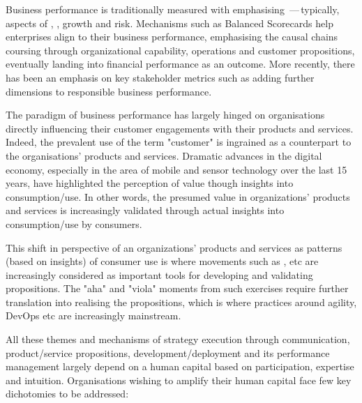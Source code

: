 Business performance is traditionally measured with  emphasising
\,---\,typically, aspects of , ,
growth and risk.
Mechanisms such as Balanced Scorecards help enterprises align 
to their business performance, emphasising the causal chains coursing through organizational capability, operations and
customer propositions, eventually landing into financial performance as an outcome.
More recently, there has been an emphasis on key stakeholder metrics such as  adding further
dimensions to responsible business performance.

The paradigm of business performance has largely hinged on organisations directly influencing their customer
engagements with their products and services.
Indeed, the prevalent use of the term "customer" is ingrained as a counterpart to the organisations’
products and services.
Dramatic advances in the digital economy, especially in the area of mobile and sensor technology over the last 15 years,
have highlighted the perception of value though insights into consumption/use.
In other words, the presumed value in organizations’ products and services is increasingly validated through
actual insights into consumption/use by consumers.

This shift in perspective of an organizations’ products and services as patterns (based on insights) of consumer use
is where movements such as ,  etc are increasingly considered
as important tools for developing and validating propositions.
The "aha" and "viola" moments from such exercises require further translation into realising the propositions,
which is where practices around agility, DevOps etc are increasingly mainstream.

All these themes and mechanisms of strategy execution through communication, product/service propositions,
development/deployment and its performance management
largely depend on a human capital based on participation, expertise and intuition.
Organisations wishing to amplify their human capital face few key dichotomies to be addressed:

